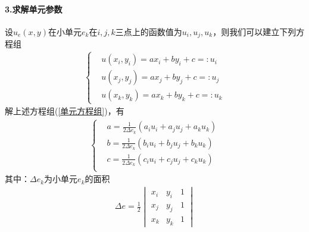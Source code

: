            \paragraph{3.求解单元参数}
            设$u_e(x,y)$在小单元$e_k$在$i,j,k$三点上的函数值为$u_i,u_j,u_k$，则我们可以建立下列方程组
            \begin{align}
                \label{单元方程组}
                \left\{
                    \begin{aligned}
                        &u(x_i,y_i) = ax_i+by_i+c =:u_i\\
                        &u(x_j,y_j) = ax_j+by_j+c =:u_j\\
                        &u(x_k,y_k) = ax_k+by_k+c =:u_k
                    \end{aligned}
                \right.
            \end{align}
            解上述方程组(\ref{单元方程组})，有
            \begin{align}
                \left\{
                    \begin{aligned}
                        &a = \frac{1}{2\Delta e_k} (a_iu_i + a_ju_j+  a_k u_k)\\
                        &b = \frac{1}{2\Delta e_k} (b_iu_i + b_ju_j+  b_k u_k)\\
                        &c = \frac{1}{2\Delta e_k} (c_iu_i + c_ju_j+  c_k u_k)\\
                    \end{aligned}
                \right.
            \end{align}
            其中：$\Delta e_k$为小单元$e_k$的面积
            \begin{align*}
                \Delta e = \frac{1}{2}
                    \begin{vmatrix}
                        x_i &y_i & 1\\
                        x_j &y_j & 1\\
                        x_k &y_k & 1
                    \end{vmatrix}
            \end{align*}

